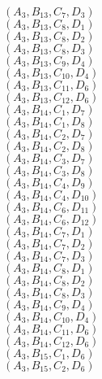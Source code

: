 \documentclass[14pt]{article}
\begin{document}
    $({A}_{3}, {B}_{13}, {C}_{7}, {D}_{3}) $ \\ 
    $({A}_{3}, {B}_{13}, {C}_{8}, {D}_{1}) $ \\ 
    $({A}_{3}, {B}_{13}, {C}_{8}, {D}_{2}) $ \\ 
    $({A}_{3}, {B}_{13}, {C}_{8}, {D}_{3}) $ \\ 
    $({A}_{3}, {B}_{13}, {C}_{9}, {D}_{4}) $ \\ 
    $({A}_{3}, {B}_{13}, {C}_{10}, {D}_{4}) $ \\ 
    $({A}_{3}, {B}_{13}, {C}_{11}, {D}_{6}) $ \\ 
    $({A}_{3}, {B}_{13}, {C}_{12}, {D}_{6}) $ \\ 
    $({A}_{3}, {B}_{14}, {C}_{1}, {D}_{7}) $ \\ 
    $({A}_{3}, {B}_{14}, {C}_{1}, {D}_{8}) $ \\ 
    $({A}_{3}, {B}_{14}, {C}_{2}, {D}_{7}) $ \\ 
    $({A}_{3}, {B}_{14}, {C}_{2}, {D}_{8}) $ \\ 
    $({A}_{3}, {B}_{14}, {C}_{3}, {D}_{7}) $ \\ 
    $({A}_{3}, {B}_{14}, {C}_{3}, {D}_{8}) $ \\ 
    $({A}_{3}, {B}_{14}, {C}_{4}, {D}_{9}) $ \\ 
    $({A}_{3}, {B}_{14}, {C}_{4}, {D}_{10}) $ \\ 
    $({A}_{3}, {B}_{14}, {C}_{6}, {D}_{11}) $ \\ 
    $({A}_{3}, {B}_{14}, {C}_{6}, {D}_{12}) $ \\ 
    $({A}_{3}, {B}_{14}, {C}_{7}, {D}_{1}) $ \\ 
    $({A}_{3}, {B}_{14}, {C}_{7}, {D}_{2}) $ \\ 
    $({A}_{3}, {B}_{14}, {C}_{7}, {D}_{3}) $ \\ 
    $({A}_{3}, {B}_{14}, {C}_{8}, {D}_{1}) $ \\ 
    $({A}_{3}, {B}_{14}, {C}_{8}, {D}_{2}) $ \\ 
    $({A}_{3}, {B}_{14}, {C}_{8}, {D}_{3}) $ \\ 
    $({A}_{3}, {B}_{14}, {C}_{9}, {D}_{4}) $ \\ 
    $({A}_{3}, {B}_{14}, {C}_{10}, {D}_{4}) $ \\ 
    $({A}_{3}, {B}_{14}, {C}_{11}, {D}_{6}) $ \\ 
    $({A}_{3}, {B}_{14}, {C}_{12}, {D}_{6}) $ \\ 
    $({A}_{3}, {B}_{15}, {C}_{1}, {D}_{6}) $ \\ 
    $({A}_{3}, {B}_{15}, {C}_{2}, {D}_{6}) $ \\ 
\end{document}
